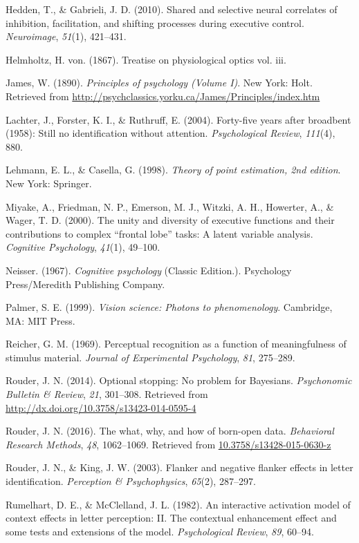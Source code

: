 \documentclass[english,floatsintext,man]{apa6}
\theoremstyle{definition}
\theoremstyle{definition}
\theoremstyle{remark}
\begin{document}
\hypertarget{ref-Hedden:Gabrieli:2010}{}
Hedden, T., \& Gabrieli, J. D. (2010). Shared and selective neural
correlates of inhibition, facilitation, and shifting processes during
executive control. \emph{Neuroimage}, \emph{51}(1), 421--431.

\hypertarget{ref-Helmholtz:1867}{}
Helmholtz, H. von. (1867). Treatise on physiological optics vol. iii.

\hypertarget{ref-James:1890a}{}
James, W. (1890). \emph{Principles of psychology (Volume I)}. New York:
Holt. Retrieved from
\url{http://psychclassics.yorku.ca/James/Principles/index.htm}

\hypertarget{ref-Lachter:etal:2004}{}
Lachter, J., Forster, K. I., \& Ruthruff, E. (2004). Forty-five years
after broadbent (1958): Still no identification without attention.
\emph{Psychological Review}, \emph{111}(4), 880.

\hypertarget{ref-Lehmann:Casella:1998}{}
Lehmann, E. L., \& Casella, G. (1998). \emph{Theory of point estimation,
2nd edition}. New York: Springer.

\hypertarget{ref-Miyake:etal:2000}{}
Miyake, A., Friedman, N. P., Emerson, M. J., Witzki, A. H., Howerter,
A., \& Wager, T. D. (2000). The unity and diversity of executive
functions and their contributions to complex ``frontal lobe'' tasks: A
latent variable analysis. \emph{Cognitive Psychology}, \emph{41}(1),
49--100.

\hypertarget{ref-Neisser:1967}{}
Neisser. (1967). \emph{Cognitive psychology} (Classic Edition.).
Psychology Press/Meredith Publishing Company.

\hypertarget{ref-Palmer:1999}{}
Palmer, S. E. (1999). \emph{Vision science: Photons to phenomenology}.
Cambridge, MA: MIT Press.

\hypertarget{ref-Reicher:1969}{}
Reicher, G. M. (1969). Perceptual recognition as a function of
meaningfulness of stimulus material. \emph{Journal of Experimental
Psychology}, \emph{81}, 275--289.

\hypertarget{ref-Rouder:2014}{}
Rouder, J. N. (2014). Optional stopping: No problem for Bayesians.
\emph{Psychonomic Bulletin \& Review}, \emph{21}, 301--308. Retrieved
from \url{http://dx.doi.org/10.3758/s13423-014-0595-4}

\hypertarget{ref-Rouder:2016}{}
Rouder, J. N. (2016). The what, why, and how of born-open data.
\emph{Behavioral Research Methods}, \emph{48}, 1062--1069. Retrieved
from \url{10.3758/s13428-015-0630-z}

\hypertarget{ref-Rouder:King:2003}{}
Rouder, J. N., \& King, J. W. (2003). Flanker and negative flanker
effects in letter identification. \emph{Perception \& Psychophysics},
\emph{65}(2), 287--297.

\hypertarget{ref-Rumelhart:McClelland:1982}{}
Rumelhart, D. E., \& McClelland, J. L. (1982). An interactive activation
model of context effects in letter perception: II. The contextual
enhancement effect and some tests and extensions of the model.
\emph{Psychological Review}, \emph{89}, 60--94.
\end{document}
